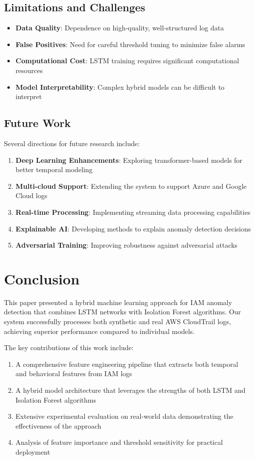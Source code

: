 \documentclass[conference]{IEEEtran}
\begin{document}
\subsection{Limitations and Challenges}
\begin{itemize}
    \item \textbf{Data Quality}: Dependence on high-quality, well-structured log data
    \item \textbf{False Positives}: Need for careful threshold tuning to minimize false alarms
    \item \textbf{Computational Cost}: LSTM training requires significant computational resources
    \item \textbf{Model Interpretability}: Complex hybrid models can be difficult to interpret
\end{itemize}

\subsection{Future Work}
Several directions for future research include:

\begin{enumerate}
    \item \textbf{Deep Learning Enhancements}: Exploring transformer-based models for better temporal modeling
    \item \textbf{Multi-cloud Support}: Extending the system to support Azure and Google Cloud logs
    \item \textbf{Real-time Processing}: Implementing streaming data processing capabilities
    \item \textbf{Explainable AI}: Developing methods to explain anomaly detection decisions
    \item \textbf{Adversarial Training}: Improving robustness against adversarial attacks
\end{enumerate}

\section{Conclusion}
This paper presented a hybrid machine learning approach for IAM anomaly detection that combines LSTM networks with Isolation Forest algorithms. Our system successfully processes both synthetic and real AWS CloudTrail logs, achieving superior performance compared to individual models.

The key contributions of this work include:

\begin{enumerate}
    \item A comprehensive feature engineering pipeline that extracts both temporal and behavioral features from IAM logs
    \item A hybrid model architecture that leverages the strengths of both LSTM and Isolation Forest algorithms
    \item Extensive experimental evaluation on real-world data demonstrating the effectiveness of the approach
    \item Analysis of feature importance and threshold sensitivity for practical deployment
\end{enumerate}
\end{document}
